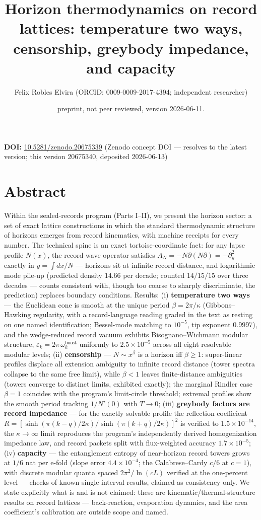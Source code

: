 \documentclass[11pt]{article}
\title{Horizon thermodynamics on record lattices: temperature two ways, censorship, greybody impedance, and capacity}
\author{Felix Robles Elvira (ORCID: 0009-0009-2017-4394; independent researcher)}
\date{\small preprint, not peer reviewed, version 2026-06-11.}
\begin{document}
\maketitle

\textbf{DOI:} \href{https://doi.org/10.5281/zenodo.20675339}{10.5281/zenodo.20675339} (Zenodo concept DOI — resolves to the latest version; this version 20675340, deposited 2026-06-13)

\section*{Abstract}
Within the sealed-records program (Parts I–II), we present the horizon sector: a set of exact lattice constructions in which the standard thermodynamic structure of horizons emerges from record kinematics, with machine receipts for every number.  The technical spine is an exact tortoise-coordinate fact: for any lapse profile $N(x)$, the record wave operator satisfies $A_N = -N\partial(N \partial) = -\partial_y^2$ exactly in $y = \int dx/N$ — horizons sit at infinite record distance, and logarithmic mode pile-up (predicted density $14.66$ per decade; counted $14/15/15$ over three decades — counts consistent with, though too coarse to sharply discriminate, the prediction) replaces boundary conditions.  Results: (i) \textbf{temperature two ways} — the Euclidean cone is smooth at the unique period $\beta = 2\pi/\kappa$ (Gibbons–Hawking regularity, with a record-language reading graded in the text as resting on one named identification; Bessel-mode matching to $10^{-5}$, tip exponent $0.9997$), and the wedge-reduced record vacuum exhibits Bisognano–Wichmann modular structure, $\varepsilon_k = 2\pi\,\omega_k^{\mathrm{boost}}$ uniformly to $2.5\times 10^{-5}$ across all eight resolvable modular levels; (ii) \textbf{censorship} — $N \sim x^\beta$ is a horizon iff $\beta \ge 1$: super-linear profiles displace all extension ambiguity to infinite record distance (tower spectra collapse to the same free limit), while $\beta < 1$ leaves finite-distance ambiguities (towers converge to distinct limits, exhibited exactly); the marginal Rindler case $\beta = 1$ coincides with the program's limit-circle threshold; extremal profiles show the smooth period tracking $1/N'(0)$ with $T \to 0$; (iii) \textbf{greybody factors are record impedance} — for the exactly solvable profile the reflection coefficient $R = [\sinh(\pi(k-q)/2\kappa)/\sinh(\pi(k+q)/2\kappa)]^2$ is verified to $1.5\times 10^{-14}$, the $\kappa \to \infty$ limit reproduces the program's independently derived homogenization impedance law, and record packets split with flux-weighted accuracy $1.7\times 10^{-5}$; (iv) \textbf{capacity} — the entanglement entropy of near-horizon record towers grows at $1/6$ nat per e-fold (slope error $4.4\times 10^{-4}$; the Calabrese–Cardy $c/6$ at $c = 1$), with discrete modular quanta spaced $2\pi^2/\ln(cL)$ verified at the one-percent level — checks of known single-interval results, claimed as consistency only.  We state explicitly what is and is not claimed: these are kinematic/thermal-structure results on record lattices — back-reaction, evaporation dynamics, and the area coefficient's calibration are outside scope and named.
\end{document}
